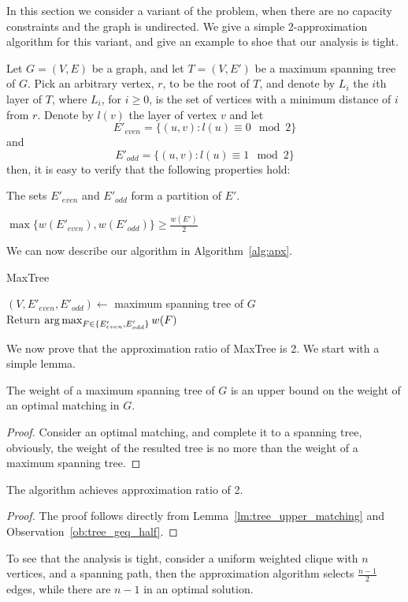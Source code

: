 \label{sub:ucudcm}
In this section we consider a variant of the problem, 
when there are no capacity constraints and the graph is undirected.
We give a simple 2-approximation algorithm for this variant, 
and give an example to shoe that our analysis is tight.

Let $G = (V, E)$ be a graph, 
and let $T = (V, E')$ be a maximum spanning tree of $G$.
Pick an arbitrary vertex, $r$, to be the root of $T$, 
and denote by $L_i$ the $i$th layer of $T$, 
where $L_i$, for $i \geq 0$, is the set of vertices with a minimum distance of $i$ from $r$.
Denote by $l(v)$ the layer of vertex $v$ and let 
$$ E'_{even} = \{ (u, v) : l(u) \equiv 0 \mod 2 \} $$
and    
$$ E'_{odd} = \{ (u, v) : l(u) \equiv 1 \mod 2 \} $$
then, it is easy to verify that the following properties hold:

\begin{observation}
The sets $E'_{even}$ and $E'_{odd}$ form a partition of $E'$. 
\end{observation}

\begin{observation}
\label{ob:tree_geq_half}
$ \max\{w(E'_{even}), w(E'_{odd})\}  \geq \frac{w(E')}{2} $
\end{observation}

We can now describe our algorithm in Algorithm~\ref{alg:apx}.

\begin{algorithm}
\label{alg:apx}
\caption{MaxTree}
$(V, E'_{even}, E'_{odd}) \leftarrow$ maximum spanning tree of $G$		\\
Return $\operatorname*{arg\,max}_{F \in \{ E'_{even}, E'_{odd} \}}{w(F)} $	\\
\end{algorithm}

We now prove that the approximation ratio of MaxTree is 2.
We start with a simple lemma.

\begin{lemma}
\label{lm:tree_upper_matching}
The weight of a maximum spanning tree of $G$ is an upper bound on the weight of
an optimal matching in $G$.
\end{lemma}

\begin{proof}
Consider an optimal matching, and complete it to a spanning tree, obviously, the
weight of the resulted tree is no more than the weight of a maximum spanning
tree.
\end{proof}

\begin{theorem}
The \UCUDCARPOOL{} algorithm achi\-eves approximation ratio of 2.
\end{theorem}

\begin{proof}
The proof follows directly from 
Lemma~\ref{lm:tree_upper_matching} and Observation~\ref{ob:tree_geq_half}.
\end{proof}

To see that the analysis is tight, 
consider a uniform weighted clique with $n$ vertices, 
and a spanning path, 
then the approximation algorithm selects $\frac{n - 1}{2}$ edges, 
while there are $n - 1$ in an optimal solution.  